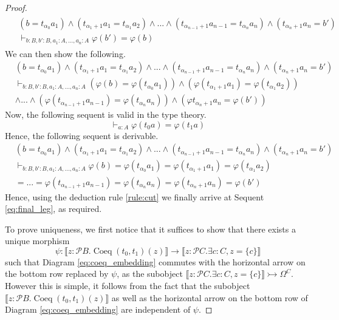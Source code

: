 \documentclass{birkjour}
\theoremstyle{plain}
\theoremstyle{definition}
\newcommand{\call}[1]{\mathcal{#1}}
\newcommand{\lto}{\longrightarrow}
\begin{document}
\begin{proof}
		\begin{align}\label{eq:final_leg}
			\begin{split}
				&(b = t_{\alpha_0}a_1) \wedge (t_{\alpha_1 + 1}a_1 = t_{\alpha_1}a_2) \wedge ... \wedge (t_{\alpha_{n-1}+1}a_{n-1} = t_{\alpha_{n}}a_{n}) \wedge (t_{\alpha_{n}+1}a_{n} = b') \\
				&\vdash_{b:B,b':B,a_1:A,...,a_n:A} \varphi(b') = \varphi(b)
			\end{split}
		\end{align}
		We can then show the following.
		\begin{align*}
			&(b = t_{\alpha_0}a_1) \wedge (t_{\alpha_1 + 1}a_1 = t_{\alpha_1}a_2) \wedge ... \wedge (t_{\alpha_{n-1}+1}a_{n-1} = t_{\alpha_{n}}a_{n}) \wedge (t_{\alpha_{n}+1}a_{n} = b') \\
			&\vdash_{b:B,b':B,a_1:A,...,a_n:A}
			(\varphi(b) = \varphi(t_{\alpha_0}a_1)) \wedge (\varphi(t_{\alpha_1 + 1}a_1) = \varphi (t_{\alpha_1}a_2))\\
			& \wedge ... \wedge (\varphi(t_{\alpha_{n-1}+1}a_{n-1}) = \varphi(t_{\alpha_{n}}a_{n})) \wedge (\varphi t_{\alpha_n + 1}a_n = \varphi(b'))
		\end{align*}
		Now, the following sequent is valid in the type theory.
		\begin{equation}
			\vdash_{a:A}\varphi (t_0 a) = \varphi (t_1 a)
		\end{equation}
		Hence, the following sequent is derivable.
		\begin{align*}
			&(b = t_{\alpha_0}a_1) \wedge (t_{\alpha_1 + 1}a_1 = t_{\alpha_1}a_2) \wedge ... \wedge (t_{\alpha_{n-1}+1}a_{n-1} = t_{\alpha_{n}}a_{n}) \wedge (t_{\alpha_{n}+1}a_{n} = b') \\
			&\vdash_{b:B,b':B,a_1:A,...,a_n:A}
			\varphi(b) = \varphi(t_{\alpha_0}a_1) = \varphi(t_{\alpha_1 + 1}a_1) = \varphi(t_{\alpha_1}a_2)\\
			& = ... = \varphi(t_{\alpha_{n-1}+1}a_{n-1}) = \varphi(t_{\alpha_{n}}a_{n}) = \varphi (t_{\alpha_n + 1}a_n) = \varphi(b')
		\end{align*}
		Hence, using the deduction rule \eqref{rule:cut} we finally arrive at Sequent \eqref{eq:final_leg}, as required.
		
		To prove uniqueness, we first notice that it suffices to show that there exists a unique morphism
		\begin{equation}
			\psi: \llbracket z: \call{P}B. \operatorname{Coeq}(t_0,t_1)(z)\rrbracket \lto \llbracket z: \call{P}C. \exists c:C, z = \lbrace c \rbrace \rrbracket
		\end{equation}
		such that Diagram \eqref{eq:coeq_embedding} commutes with the horizontal arrow on the bottom row replaced by $\psi$, as the subobject $\llbracket z: \call{P}C. \exists c:C, z = \lbrace c \rbrace\rrbracket \rightarrowtail \Omega^C$. However this is simple, it follows from the fact that the subobject $\llbracket z: \call{P}B. \operatorname{Coeq}(t_0,t_1)(z)\rrbracket$ as well as the horizontal arrow on the bottom row of Diagram \eqref{eq:coeq_embedding} are independent of $\psi$.
	\end{proof}
	
\end{document}
